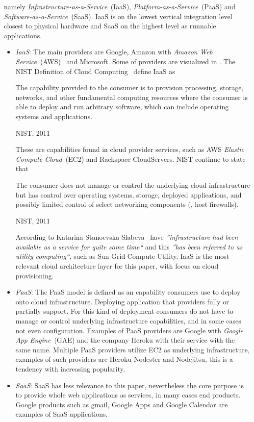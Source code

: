 namely \emph{Infrastructure-as-a-Service}~(IaaS), \emph{Platform-as-a-Service}~(PaaS)
and \emph{Software-as-a-Service}~(SaaS).
IaaS is on the lowest vertical integration level closest to physical hardware and SaaS on the highest
level as runnable applications.
\begin{itemize}
  \item \emph{IaaS}: 
    The main providers are Google, Amazon with \emph{Amazon Web Service}~(AWS)~\cite{aws} and Microsoft.
    Some of providers are visualized in .
    The NIST Definition of Cloud Computing~\cite{nist:mell11} define IaaS as
    \epigraph{The capability provided to the consumer is to provision 
      processing, storage, networks, and other fundamental computing resources where the 
      consumer is able to deploy and run arbitrary software, which can include operating 
      systems and applications.}{NIST, 2011}
    These are capabilities found in cloud provider services, 
    such as AWS \emph{Elastic Compute Cloud}~(EC2) and Rackspace CloudServers.
    NIST continue to state that 
    \epigraph{The consumer does not manage or control the underlying cloud 
      infrastructure but has control over operating systems, storage, deployed applications, and 
      possibly limited control of select networking components (\eg, host firewalls).}{NIST, 2011}
    According to Katarina Stanoevska-Slabeva~\cite{introduction:wozniak10} have 
    \emph{''infrastructure had been available as a service for quite some time``} and this 
    \emph{''has been referred to as utility computing``}, such as Sun Grid Compute Utility.
    IaaS is the most relevant cloud architecture layer for this paper, with focus
    on cloud provisioning.
  \item \emph{PaaS}:
    The PaaS model is defined as an capability consumers use to deploy onto cloud infrastructure.
    Deploying application that providers fully or partially support. For this kind of deployment
    consumers do not have to manage or control underlying infrastructure capabilities,
    and in some cases not even configuration.
    Examples of PaaS providers are Google with \emph{Google App Engine}~(GAE) and
    the company Heroku with their service with the same name.
    Multiple PaaS providers utilize EC2 as underlying infrastructure, examples of such
    providers are Heroku Nodester and Nodejitsu, this is a tendency with increasing popularity.
  \item \emph{SaaS}:
    SaaS has less relevance to this paper, nevertheless the core purpose
    is to provide whole web applications as services, in many cases end products.
    Google products such as gmail, Google Apps and  Google Calendar are examples of 
    SaaS applications.
\end{itemize}

